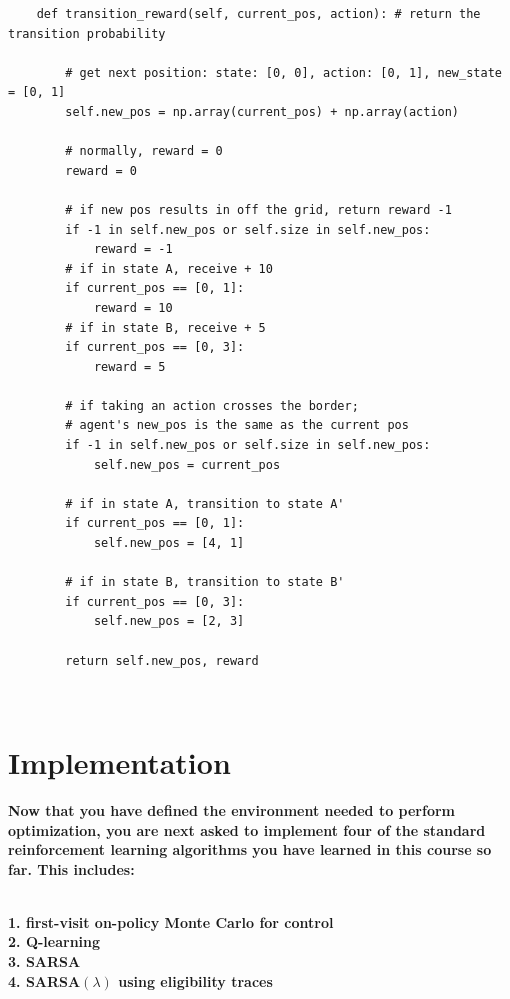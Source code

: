\documentclass[11pt]{article}
\begin{document}
\lstset{language=Python}
\lstset{frame=lines}
\lstset{basicstyle=\footnotesize}
\begin{lstlisting}
    def transition_reward(self, current_pos, action): # return the transition probability

        # get next position: state: [0, 0], action: [0, 1], new_state = [0, 1]
        self.new_pos = np.array(current_pos) + np.array(action)

        # normally, reward = 0
        reward = 0

        # if new pos results in off the grid, return reward -1
        if -1 in self.new_pos or self.size in self.new_pos:
            reward = -1
        # if in state A, receive + 10
        if current_pos == [0, 1]:
            reward = 10
        # if in state B, receive + 5
        if current_pos == [0, 3]:
            reward = 5

        # if taking an action crosses the border; 
        # agent's new_pos is the same as the current pos
        if -1 in self.new_pos or self.size in self.new_pos: 
            self.new_pos = current_pos
            
        # if in state A, transition to state A'
        if current_pos == [0, 1]:
            self.new_pos = [4, 1]
            
        # if in state B, transition to state B'
        if current_pos == [0, 3]:
            self.new_pos = [2, 3]
        
        return self.new_pos, reward
\end{lstlisting}
\\
\section{Implementation}
\textbf{Now that you have defined the environment needed to
perform optimization, you are next asked to implement four of the standard reinforcement
learning algorithms you have learned in this course so far. This includes:}

\\
\indent\textbf{1. first-visit on-policy Monte Carlo for control}
\\
\indent\textbf{2. Q-learning}
\\
\indent\textbf{3. SARSA}
\\
\indent\textbf{4. SARSA$(\lambda)$ using eligibility traces}
\\
\end{document}
